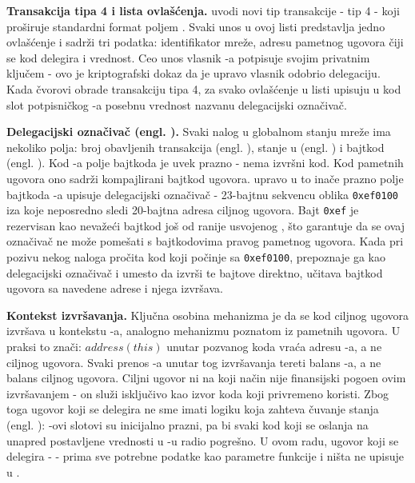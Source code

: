 \textbf{Transakcija tipa 4 i lista ovla\v s\' cenja.}  uvodi novi tip transakcije - tip 4 - koji pro\v siruje standardni format poljem . Svaki unos u ovoj listi predstavlja jedno ovla\v s\' cenje i sadr\v zi tri podatka: identifikator mre\v ze, adresu pametnog ugovora \v ciji se kod delegira i  vrednost. Ceo unos vlasnik -a potpisuje svojim privatnim klju\v cem - ovo je kriptografski dokaz da je upravo vlasnik odobrio delegaciju. Kada  \v cvorovi obrade transakciju tipa 4, za svako ovla\v s\' cenje u listi upisuju u kod slot potpisni\v ckog -a posebnu vrednost nazvanu delegacijski ozna\v civa\v c.

\textbf{Delegacijski ozna\v civa\v c (engl. ).} Svaki  nalog u globalnom stanju mre\v ze ima nekoliko polja: broj obavljenih transakcija (engl. ), stanje u  (engl. ) i bajtkod (engl. ). Kod -a polje bajtkoda je uvek prazno -  nema izvr\v sni kod. Kod pametnih ugovora ono sadr\v zi kompajlirani bajtkod ugovora.  upravo u to ina\v ce prazno polje bajtkoda -a upisuje delegacijski ozna\v civa\v c - 23-bajtnu sekvencu oblika \texttt{0xef0100} iza koje neposredno sledi 20-bajtna adresa ciljnog ugovora. Bajt \texttt{0xef} je rezervisan kao neva\v ze\' ci  bajtkod jo\v s od ranije usvojenog , \v sto garantuje da se ovaj ozna\v civa\v c ne mo\v ze pome\v sati s bajtkodovima pravog pametnog ugovora. Kada  pri pozivu nekog naloga pro\v cita kod koji po\v cinje sa \texttt{0xef0100}, prepoznaje ga kao delegacijski ozna\v civa\v c i umesto da izvr\v si te bajtove direktno, u\v citava bajtkod ugovora sa navedene adrese i njega izvr\v sava.

\textbf{Kontekst izvr\v savanja.} Klju\v cna osobina mehanizma je da se kod ciljnog ugovora izvr\v sava u kontekstu -a, analogno mehanizmu  \cite{eip7} poznatom iz pametnih ugovora. U praksi to zna\v ci: $address(this)$ unutar pozvanog koda vra\' ca adresu -a, a ne ciljnog ugovora. Svaki prenos -a unutar tog izvr\v savanja tereti balans -a, a ne balans ciljnog ugovora. Ciljni ugovor ni na koji na\v cin nije finansijski pogo\dj en ovim izvr\v savanjem - on slu\v zi isklju\v civo kao izvor koda koji  privremeno koristi. Zbog toga ugovor koji se delegira ne sme imati logiku koja zahteva \v cuvanje stanja (engl. ): -ovi  slotovi su inicijalno prazni, pa bi svaki kod koji se oslanja na unapred postavljene vrednosti u -u radio pogre\v sno. U ovom radu, ugovor koji se delegira -  - prima sve potrebne podatke kao parametre funkcije i ni\v sta ne upisuje u .

